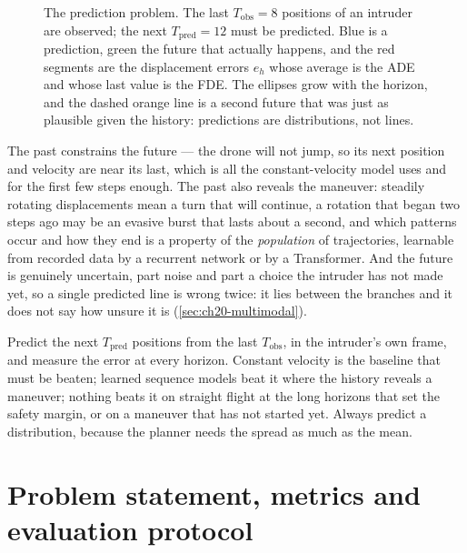 \begin{figure}[tb]
  \centering
  \caption{The prediction problem. The last $T_{\mathrm{obs}} = 8$ positions of
  an intruder are observed; the next $T_{\mathrm{pred}} = 12$ must be
  predicted. Blue is a prediction, green the future that actually happens, and
  the red segments are the displacement errors $e_h$ whose average is the ADE
  and whose last value is the FDE. The ellipses grow with the horizon, and the
  dashed orange line is a second future that was just as plausible given the
  history: predictions are distributions, not lines.}
  \label{fig:ch20-idea}
\end{figure}

The past constrains the future --- the drone will not jump, so its next
position and velocity are near its last, which is all the constant-velocity
model uses and for the first few steps enough. The past also reveals the
maneuver: steadily rotating displacements mean a turn that will continue, a
rotation that began two steps ago may be an evasive burst that lasts about a
second, and which patterns occur and how they end is a property of the
\emph{population} of trajectories, learnable from recorded data by a
recurrent network or by a Transformer. And the future is genuinely uncertain,
part noise and part a choice the intruder has not made yet, so a single
predicted line is wrong twice: it lies between the branches and it does not
say how unsure it is (\cref{sec:ch20-multimodal}).

\begin{keyidea}
Predict the next $T_{\mathrm{pred}}$ positions from the last $T_{\mathrm{obs}}$,
in the intruder's own frame, and measure the error at every horizon.
Constant velocity is the baseline that must be beaten; learned sequence
models beat it where the history reveals a maneuver; nothing beats it on
straight flight at the long horizons that set the safety margin, or on a
maneuver that has not started yet. Always predict a
distribution, because the planner needs the spread as much as the mean.
\end{keyidea}

\section{Problem statement, metrics and evaluation protocol}
\label{sec:ch20-problem}

